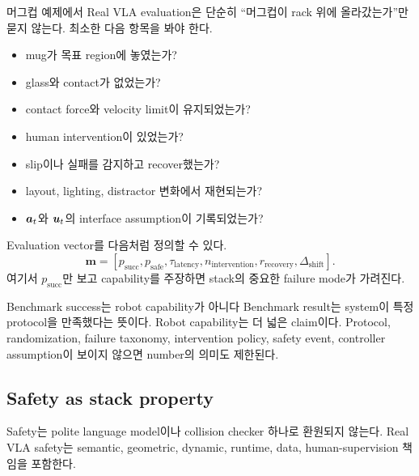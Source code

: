 머그컵 예제에서 Real VLA evaluation은 단순히 ``머그컵이 rack 위에 올라갔는가''만 묻지 않는다. 최소한 다음 항목을 봐야 한다.
\begin{itemize}
  \item mug가 목표 region에 놓였는가?
  \item glass와 contact가 없었는가?
  \item contact force와 velocity limit이 유지되었는가?
  \item human intervention이 있었는가?
  \item slip이나 실패를 감지하고 recover했는가?
  \item layout, lighting, distractor 변화에서 재현되는가?
  \item $\bm{a}_t$와 $\bm{u}_t$의 interface assumption이 기록되었는가?
\end{itemize}

Evaluation vector를 다음처럼 정의할 수 있다.
\begin{equation}
  \bm{m} =
  \left[
  p_{\mathrm{succ}},
  p_{\mathrm{safe}},
  \tau_{\mathrm{latency}},
  n_{\mathrm{intervention}},
  r_{\mathrm{recovery}},
  \Delta_{\mathrm{shift}}
  \right].
  \label{eq:evaluation-vector}
\end{equation}
여기서 $p_{\mathrm{succ}}$만 보고 capability를 주장하면 stack의 중요한 failure mode가 가려진다.

\begin{warningbox}{Benchmark success는 robot capability가 아니다}
Benchmark result는 system이 특정 protocol을 만족했다는 뜻이다. Robot capability는 더 넓은 claim이다. Protocol, randomization, failure taxonomy, intervention policy, safety event, controller assumption이 보이지 않으면 number의 의미도 제한된다.
\end{warningbox}

\subsection{Safety as stack property}
Safety는 polite language model이나 collision checker 하나로 환원되지 않는다. Real VLA safety는 semantic, geometric, dynamic, runtime, data, human-supervision 책임을 포함한다.

